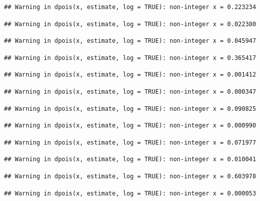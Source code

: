 \documentclass[]{article}
\begin{document}
\begin{verbatim}
## Warning in dpois(x, estimate, log = TRUE): non-integer x = 0.223234
\end{verbatim}

\begin{verbatim}
## Warning in dpois(x, estimate, log = TRUE): non-integer x = 0.022380
\end{verbatim}

\begin{verbatim}
## Warning in dpois(x, estimate, log = TRUE): non-integer x = 0.045947
\end{verbatim}

\begin{verbatim}
## Warning in dpois(x, estimate, log = TRUE): non-integer x = 0.365417
\end{verbatim}

\begin{verbatim}
## Warning in dpois(x, estimate, log = TRUE): non-integer x = 0.001412
\end{verbatim}

\begin{verbatim}
## Warning in dpois(x, estimate, log = TRUE): non-integer x = 0.000347
\end{verbatim}

\begin{verbatim}
## Warning in dpois(x, estimate, log = TRUE): non-integer x = 0.090825
\end{verbatim}

\begin{verbatim}
## Warning in dpois(x, estimate, log = TRUE): non-integer x = 0.000990
\end{verbatim}

\begin{verbatim}
## Warning in dpois(x, estimate, log = TRUE): non-integer x = 0.071977
\end{verbatim}

\begin{verbatim}
## Warning in dpois(x, estimate, log = TRUE): non-integer x = 0.010041
\end{verbatim}

\begin{verbatim}
## Warning in dpois(x, estimate, log = TRUE): non-integer x = 0.603978
\end{verbatim}

\begin{verbatim}
## Warning in dpois(x, estimate, log = TRUE): non-integer x = 0.000053
\end{verbatim}
\end{document}
